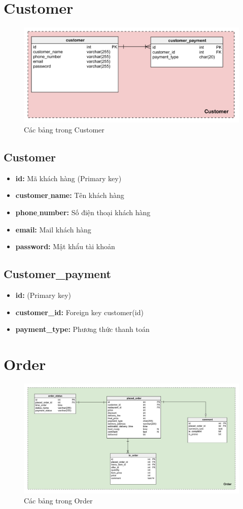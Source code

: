 \documentclass[a4paper,12pt]{article}
\begin{document}
\section{Customer}
\begin{figure}[ht!]
	\centerline{\includegraphics[width=1\textwidth]{customer.png}}
	\label{fig:ass1}
	\caption{Các bảng trong Customer}
\end{figure}
\noindent
\subsection{Customer}
\begin{itemize}
	\item \textbf{id:} Mã khách hàng (Primary key)
	\item \textbf{customer$\_$name:} Tên khách hàng
	\item \textbf{phone$\_$number:} Số điện thoại khách hàng
	\item \textbf{email:} Mail khách hàng
	\item \textbf{password:} Mật khẩu tài khoản
\end{itemize}
\subsection{Customer\_payment}
\begin{itemize}
	\item \textbf{id:} (Primary key)
	\item \textbf{customer\_id:} Foreign key customer(id)
	\item \textbf{payment\_type:} Phương thức thanh toán
\end{itemize}
\clearpage
\section{Order}
\begin{figure}[ht!]
	\centerline{\includegraphics[width=1\textwidth]{order.png}}
	\label{fig:ass1}
	\caption{Các bảng trong Order}
\end{figure}
\end{document}
